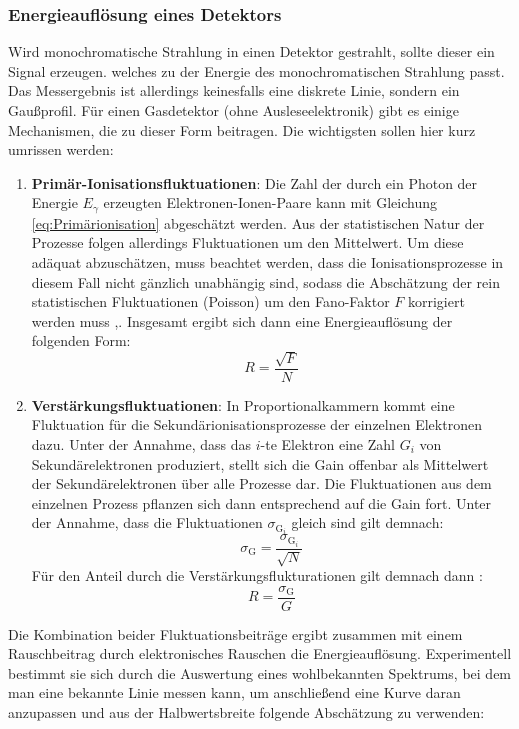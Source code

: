 				\newpage
			\subsubsection{Energieauflösung eines Detektors}
				Wird monochromatische Strahlung in einen Detektor gestrahlt, sollte dieser ein Signal erzeugen. welches zu der Energie des monochromatischen Strahlung passt. Das Messergebnis ist allerdings keinesfalls eine diskrete Linie, sondern ein Gaußprofil. Für einen Gasdetektor (ohne Ausleseelektronik) gibt es einige Mechanismen, die zu dieser Form beitragen. Die wichtigsten sollen hier kurz umrissen werden:
				\begin{enumerate}
					\item \textbf{Primär-Ionisationsfluktuationen}: Die Zahl der durch ein Photon der Energie $E_{\gamma}$ erzeugten Elektronen-Ionen-Paare kann mit Gleichung \ref{eq:Primärionisation} abgeschätzt werden. Aus der statistischen Natur der Prozesse folgen allerdings Fluktuationen um den Mittelwert. Um diese adäquat abzuschätzen, muss beachtet werden, dass die Ionisationsprozesse in diesem Fall nicht gänzlich unabhängig sind, sodass die Abschätzung der rein statistischen Fluktuationen (Poisson) um den Fano-Faktor $F$ korrigiert werden muss \cite{ottnad},\cite{Leo}. Insgesamt ergibt sich dann eine Energieauflösung der folgenden Form: 
					\begin{equation*}
						R=\frac{\sqrt{F}}{N}
					\end{equation*}
					\item \textbf{Verstärkungsfluktuationen}: In Proportionalkammern kommt eine Fluktuation für die Sekundärionisationsprozesse der einzelnen Elektronen dazu. Unter der Annahme, dass das $i$-te Elektron eine Zahl $G_{i}$ von Sekundärelektronen produziert, stellt sich die Gain offenbar als Mittelwert der Sekundärelektronen über alle Prozesse dar. Die Fluktuationen aus dem einzelnen Prozess pflanzen sich dann entsprechend auf die Gain fort. Unter der Annahme, dass die Fluktuationen $\sigma_{\text{G}_{i}}$ gleich sind gilt demnach:
					\begin{equation*}
						\sigma_{\text{G}}= \frac{\sigma_{\text{G}_{i}}}{\sqrt{N}}
					\end{equation*}
				Für den Anteil durch die Verstärkungsflukturationen gilt demnach dann \cite{ottnad}:
				\begin{equation*}
					R=\frac{\sigma_{\text{G}}}{G}
				\end{equation*}
				\end{enumerate}
			Die Kombination beider Fluktuationsbeiträge ergibt zusammen mit einem Rauschbeitrag durch elektronisches Rauschen die Energieauflösung. Experimentell bestimmt sie sich durch die Auswertung eines wohlbekannten Spektrums, bei dem man eine bekannte Linie messen kann, um anschließend eine Kurve daran anzupassen und aus der Halbwertsbreite folgende Abschätzung zu verwenden:
